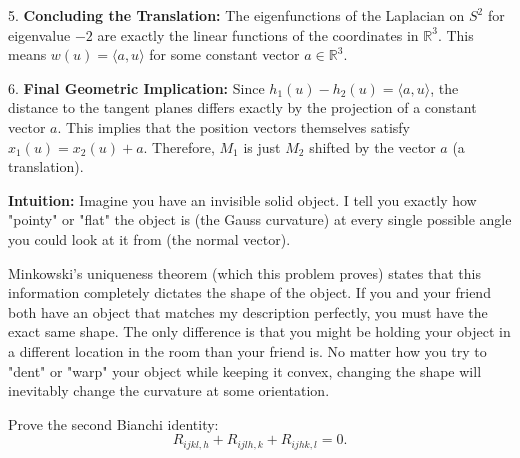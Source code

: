 \begin{solution}
5. \textbf{Concluding the Translation:}
The eigenfunctions of the Laplacian on $S^2$ for eigenvalue $-2$ are exactly the linear functions of the coordinates in $\mathbb{R}^3$. This means $w(u) = \langle a, u \rangle$ for some constant vector $a \in \mathbb{R}^3$.
\par\vspace{\baselineskip}

6. \textbf{Final Geometric Implication:}
Since $h_1(u) - h_2(u) = \langle a, u \rangle$, the distance to the tangent planes differs exactly by the projection of a constant vector $a$. This implies that the position vectors themselves satisfy $x_1(u) = x_2(u) + a$. Therefore, $M_1$ is just $M_2$ shifted by the vector $a$ (a translation).
\par\vspace{\baselineskip}

\textbf{Intuition:}
Imagine you have an invisible solid object. I tell you exactly how "pointy" or "flat" the object is (the Gauss curvature) at every single possible angle you could look at it from (the normal vector). 
\par\vspace{\baselineskip}

Minkowski's uniqueness theorem (which this problem proves) states that this information completely dictates the shape of the object. If you and your friend both have an object that matches my description perfectly, you must have the exact same shape. The only difference is that you might be holding your object in a different location in the room than your friend is. No matter how you try to "dent" or "warp" your object while keeping it convex, changing the shape will inevitably change the curvature at some orientation.
\end{solution}

\begin{exercise}
\label{geometry:2015:11}
Prove the second Bianchi identity:
\[ R_{ijkl,h} + R_{ijlh,k} + R_{ijhk,l} = 0. \]
\end{exercise}

